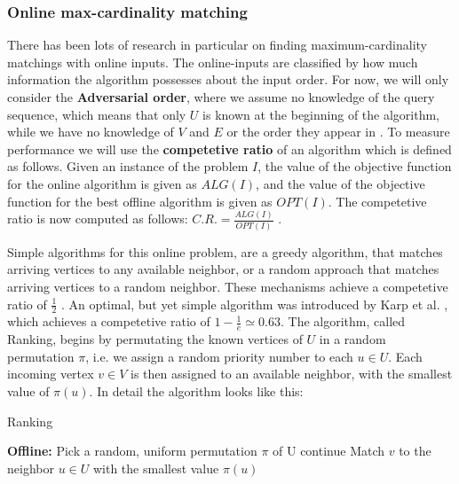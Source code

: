 \subsubsection{Online max-cardinality matching}
There has been lots of research in particular on finding maximum-cardinality matchings with online inputs. The online-inputs are classified by how much information the algorithm possesses about the input order. For now, we will only consider the \textbf{Adversarial order}, where we assume no knowledge of the query sequence, which means that only $U$ is known at the beginning of the algorithm, while we have no knowledge of $V$ and $E$ or the order they appear in \cite{Mehta:Online}. To measure performance we will use the \textbf{competetive ratio} of an algorithm which is defined as follows. Given an instance of the problem $I$, the value of the objective function for the online algorithm is given as $ALG(I)$, and the value of the objective function for the best offline algorithm is given as $OPT(I)$. The competetive ratio is now computed as follows: $C.R.=\frac{ALG(I)}{OPT(I)}$ \cite{Mehta:Online}.

Simple algorithms for this online problem, are a greedy algorithm, that matches arriving vertices to any available neighbor, or a random approach that matches arriving vertices to a random neighbor. These mechanisms achieve a competetive ratio of $\frac{1}{2}$ \cite{Mehta:Online}. An optimal, but yet simple algorithm was introduced by Karp et al. \cite{Karp:Online}, which achieves a competetive ratio of $1 - \frac{1}{e} \simeq 0.63$. The algorithm, called Ranking, begins by permutating the known vertices of $U$ in a random permutation $\pi$, i.e. we assign a random priority number to each $u \in U$. Each incoming vertex $v \in V$ is then assigned to an available neighbor, with the smallest value of $\pi(u)$. In detail the algorithm looks like this:

\begin{algorithm} %
    \caption{Ranking} 
    \label{alg:ranking} %
    \begin{algorithmic} %
        \State \textbf{Offline:} Pick a random, uniform permutation $\pi$ of U
                \State continue
            \EndIf
            \State Match $v$ to the neighbor $u \in U$ with the smallest value $\pi(u)$
        \EndFor
    \end{algorithmic}
\end{algorithm}